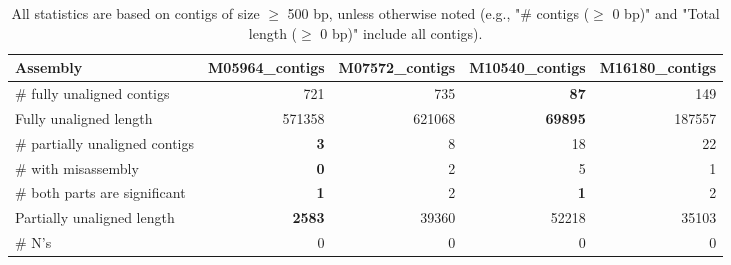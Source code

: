 \documentclass[12pt,a4paper]{article}
\begin{document}
\begin{table}[ht]
\begin{center}
\caption{All statistics are based on contigs of size $\geq$ 500 bp, unless otherwise noted (e.g., "\# contigs ($\geq$ 0 bp)" and "Total length ($\geq$ 0 bp)" include all contigs).}
\begin{tabular}{|l*{4}{|r}|}
\hline
Assembly & M05964\_contigs & M07572\_contigs & M10540\_contigs & M16180\_contigs \\ \hline
\# fully unaligned contigs & 721 & 735 & {\bf 87} & 149 \\ \hline
Fully unaligned length & 571358 & 621068 & {\bf 69895} & 187557 \\ \hline
\# partially unaligned contigs & {\bf 3} & 8 & 18 & 22 \\ \hline
\hspace{5mm}\# with misassembly & {\bf 0} & 2 & 5 & 1 \\ \hline
\hspace{5mm}\# both parts are significant & {\bf 1} & 2 & {\bf 1} & 2 \\ \hline
Partially unaligned length & {\bf 2583} & 39360 & 52218 & 35103 \\ \hline
\# N's & 0 & 0 & 0 & 0 \\ \hline
\end{tabular}
\end{center}
\end{table}
\end{document}
